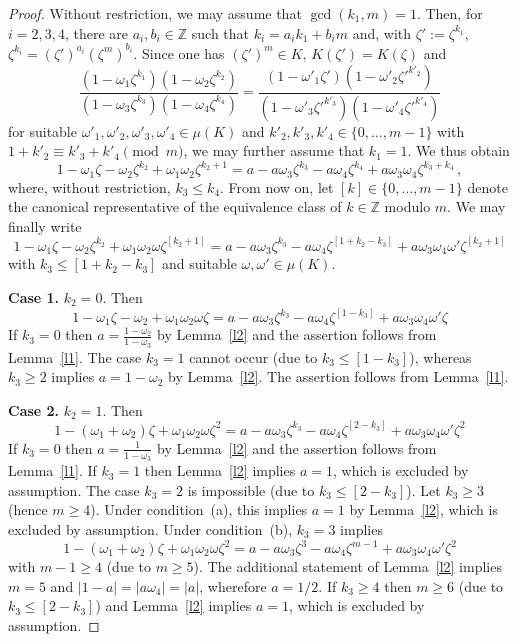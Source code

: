 \documentclass[a4paper]{amsart}
\theoremstyle{definition}
\numberwithin{equation}{section}
\numberwithin{theorem}{section}
\begin{document}
\begin{proof}
Without restriction, we may assume that
$\operatorname{gcd}(k_1,m)=1$. Then, for $i=2,3,4$,
there are $a_i,b_i\in{\mathbb{Z}}$ such that $k_i=a_ik_1+b_i m$ and, with 
$\zeta':=\zeta^{k_1}$, $\zeta^{k_i}=(\zeta')^{a_i}(\zeta^m)^{b_i}$. Since one has $(\zeta')^m\in K$, $K(\zeta')=K(\zeta)$ and 
$$
\frac{(1-\omega_1\zeta^{k_1})(1-\omega_2\zeta^{k_2})}{(1-\omega_3\zeta^{k_3})(1-\omega_4\zeta^{k_4})}=\frac{(1-\omega'_1\zeta')(1-\omega'_2\zeta'^{k'_2})}{(1-\omega'_3\zeta'^{k'_3})(1-\omega'_4\zeta'^{k'_4})}
$$
for suitable $\omega'_1,\omega'_2,\omega'_3,\omega'_4\in\mu(K)$ and
$k'_2,k'_3,k'_4\in\{0,\dots,m-1\}$ with $1+k'_2\equiv k'_3+k'_4 \pmod
m$, we may further assume that
$k_1=1$. We thus obtain
$$
1-\omega_1\zeta-\omega_2\zeta^{k_2}+\omega_1\omega_2\zeta^{k_2+1}=a-a\omega_3\zeta^{k_3}-a\omega_4\zeta^{k_4}+a\omega_3\omega_4\zeta^{k_3+k_4}\,,
$$
where, without restriction, $k_3\leq k_4$. From now on, let $[k]\in\{0,\dots,m-1\}$ denote the canonical
representative of the equivalence class of $k\in{\mathbb{Z}}$ modulo
$m$. We may finally write
$$
1-\omega_1\zeta-\omega_2\zeta^{k_2}+\omega_1\omega_2\omega\zeta^{[k_2+1]}=a-a\omega_3\zeta^{k_3}-a\omega_4\zeta^{[1+k_2-k_3]}+a\omega_3\omega_4\omega'\zeta^{[k_2+1]}
$$
with $k_3\leq [1+k_2-k_3]$ and suitable $\omega,\omega'\in\mu(K)$.

{\bf Case 1.} $k_2=0$. Then
$$
1-\omega_1\zeta-\omega_2+\omega_1\omega_2\omega\zeta=a-a\omega_3\zeta^{k_3}-a\omega_4\zeta^{[1-k_3]}+a\omega_3\omega_4\omega'\zeta
$$
If $k_3=0$ then $a=\frac{1-\omega_2}{1-\omega_3}$ by Lemma~\ref{l2}
and the
assertion follows from Lemma~\ref{l1}. The case $k_3=1$ cannot occur
(due to $k_3\leq [1-k_3]$), whereas $k_3\geq 2$ implies $a=1-\omega_2$ by Lemma~\ref{l2}. The assertion follows from Lemma~\ref{l1}.  

{\bf Case 2.} $k_2=1$. Then
$$
1-(\omega_1+\omega_2)\zeta+\omega_1\omega_2\omega\zeta^2=a-a\omega_3\zeta^{k_3}-a\omega_4\zeta^{[2-k_3]}+a\omega_3\omega_4\omega'\zeta^2
$$
If $k_3=0$ then  $a=\frac{1}{1-\omega_3}$ by
Lemma~\ref{l2} and the assertion follows from
 Lemma~\ref{l1}. If $k_3=1$ then Lemma~\ref{l2} implies $a=1$, which
 is excluded by assumption. The
 case $k_3=2$ is impossible (due to $k_3\leq [2-k_3]$). Let $k_3\geq 3$
 (hence $m\geq 4$). Under condition~(a), this implies $a=1$ by
 Lemma~\ref{l2}, which
 is excluded by assumption. Under
 condition~(b), $k_3= 3$ implies
$$
1-(\omega_1+\omega_2)\zeta+\omega_1\omega_2\omega\zeta^{2}=a-a\omega_3\zeta^{3}-a\omega_4\zeta^{m-1}+a\omega_3\omega_4\omega'\zeta^{2}
$$ 
with $m-1\geq 4$ (due to $m\geq 5$). The
additional statement of Lemma~\ref{l2} implies $m=5$ and $|1-a|=|a\omega_4|=|a|$, wherefore $a=1/2$. If $k_3\geq 4$
then $m\geq 6$ (due to $k_3\leq [2-k_3]$) and Lemma~\ref{l2} implies $a=1$, which
 is excluded by assumption.  


\end{proof}
\end{document}
